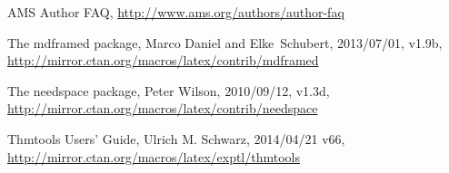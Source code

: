 \documentclass[11pt,twoside]{article}
\newcommand{\ntt}{%
  \fontfamily\ttdefault \fontseries\mddefault \fontshape\updefault
  \selectfont
}
\DeclareRobustCommand{\pkg}[1]{{\ntt#1}}
\begin{document}
\begin{thebibliography}{[MDF]}

\raggedright

 AMS Author FAQ,
  \url{http://www.ams.org/authors/author-faq}

 The \pkg{mdframed} package,
  Marco Daniel and Elke~Schubert, 2013/07/01, v1.9b,
  \url{http://mirror.ctan.org/macros/latex/contrib/mdframed}

 The \pkg{needspace} package,
  Peter Wilson, 2010/09/12, v1.3d,
  \url{http://mirror.ctan.org/macros/latex/contrib/needspace}

 \pkg{Thmtools} Users' Guide,
  Ulrich M. Schwarz, 2014/04/21 v66,
  \url{http://mirror.ctan.org/macros/latex/exptl/thmtools}

\end{thebibliography}
\end{document}
